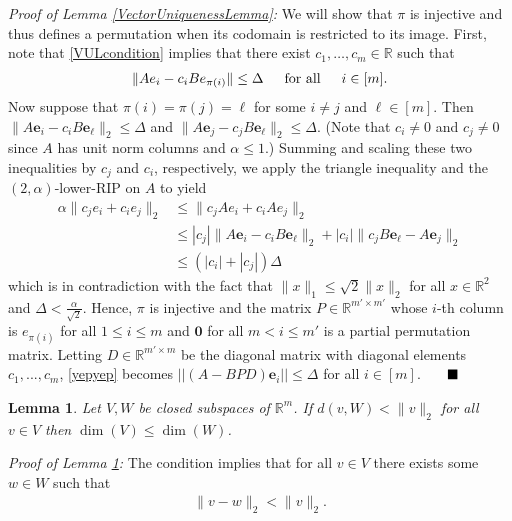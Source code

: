 \documentclass[journal,onecolumn]{IEEEtran}
\newtheorem{lemma}{Lemma}
\begin{document}
\emph{Proof of Lemma \ref{VectorUniquenessLemma}:} We will show that $\pi$ is injective and thus defines a permutation when its codomain is restricted to its image. First, note that \eqref{VULcondition} implies that there exist $c_1, \ldots, c_m \in \mathbb{R}$ such that 
\begin{align}\label{yepyep}
\|Ae_i - c_iBe_{\pi(i)}\| \leq \Delta \indent \text{for all} \indent i \in [m].
\end{align}
Now suppose that $\pi(i) = \pi(j) = \ell$ for some $i \neq j$ and $\ell \in [m]$. Then $\|A\mathbf{e}_i - c_iB\mathbf{e}_{\ell}\|_2  \leq \Delta$ and $\|A\mathbf{e}_j - c_jB\mathbf{e}_{\ell}\|_2 \leq \Delta$. (Note that $c_i \neq 0$ and $c_j \neq 0$ since $A$ has unit norm columns and $\alpha \leq 1$.) Summing and scaling these two inequalities by $c_j$ and $c_i$, respectively, we apply the triangle inequality and the $(2,\alpha)$-lower-RIP on $A$ to yield
\begin{align}
\alpha\|c_je_i + c_ie_j\|_2 &\leq \|c_jAe_i + c_iAe_j\|_2 \\
&\leq |c_j|\|A\mathbf{e}_i - c_iB\mathbf{e}_{\ell}\|_2 + |c_i|\|c_jB\mathbf{e}_{\ell} - A\mathbf{e}_j\|_2 \\
&\leq (|c_i| + |c_j|) \Delta
\end{align}
%
which is in contradiction with the fact that $\|x\|_1 \leq \sqrt{2}\|x\|_2$ for all $x \in \mathbb{R}^2$ and $\Delta < \frac{\alpha}{\sqrt{2}}$. Hence, $\pi$ is injective and the matrix $P \in \mathbb{R}^{m' \times m'}$ whose $i$-th column is $e_{\pi(i)}$ for all $1 \leq i \leq m$ and $\mathbf{0}$ for all $m < i \leq m'$ is a partial permutation matrix. Letting $D \in \mathbb{R}^{m' \times m}$ be the diagonal matrix with diagonal elements $c_1, ..., c_m$, \eqref{yepyep} becomes $||(A - BPD)\mathbf{e}_i|| \leq \Delta$ for all $i \in [m]$. $\indent \blacksquare$


\begin{lemma}\label{MinimalDimensionLemma}
Let $V,W$ be closed subspaces of $\mathbb{R}^m$. If $d(v, W) < \|v\|_2$ for all $v \in V$ then $\dim(V) \leq \dim(W)$.
\end{lemma}

\emph{Proof of Lemma \ref{MinimalDimensionLemma}:} The condition implies that for all $v \in V$ there exists some $w \in W$ such that
\begin{align}\label{MinDimEq}
\|v - w\|_2 < \|v\|_2.
\end{align}
\end{document}
